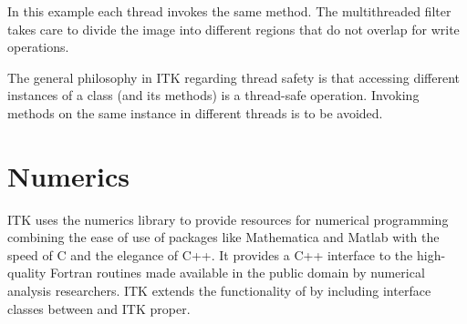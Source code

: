 In this example each thread invokes the same method. The multithreaded filter
takes care to divide the image into different regions that do not overlap for
write operations.

The general philosophy in ITK regarding thread safety is that accessing
different instances of a class (and its methods) is a thread-safe operation.
Invoking methods on the same instance in different threads is to be avoided.


%
%

\section{Numerics}
\label{sec:Numerics}


ITK uses the  numerics library to provide resources for numerical
programming combining the ease of use of packages like Mathematica and Matlab
with the speed of C and the elegance of C++. It provides a C++ interface to
the high-quality Fortran routines made available in the public domain by
numerical analysis researchers. ITK extends the functionality of 
by including interface classes between  and ITK proper.

